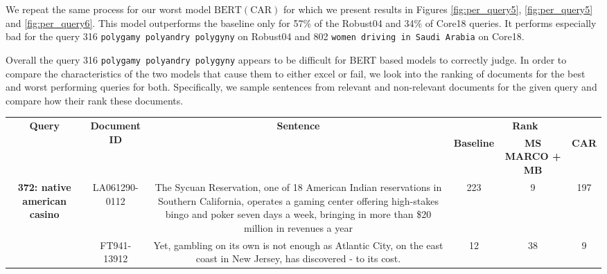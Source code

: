 We repeat the same process for our worst model $ \textrm{BERT}(\textrm{CAR}) $ for which we present results in Figures \ref{fig:per_query5}, \ref{fig:per_query5} and \ref{fig:per_query6}.
This model outperforms the baseline only for 57\% of the Robust04 and 34\% of Core18 queries.
It performs especially bad for the query 316 \texttt{polygamy polyandry polygyny} on Robust04 and 802 \texttt{women driving in Saudi Arabia} on Core18.

Overall the query 316 \texttt{polygamy polyandry polygyny} appears to be difficult for BERT based models to correctly judge.
In order to compare the characteristics of the two models that cause them to either excel or fail, we look into the ranking of documents for the best and worst performing queries for both.
Specifically, we sample sentences from relevant and non-relevant documents for the given query and compare how their rank these documents.

\begin{table}[]
\begin{tabular}{|c|c|c|c|c|c|}
\hline
\multirow{2}{*}{\textbf{Query}}                       & \multirow{2}{*}{\textbf{Document ID}} & \multirow{2}{*}{\textbf{Sentence}}                                                                                                                                                                                            & \multicolumn{3}{c|}{\textbf{Rank}}                                             \\ \cline{4-6} 
                                                      &                                       &                                                                                                                                                                                                                               & \textbf{Baseline} & \textbf{MS MARCO + MB} & \multicolumn{1}{l|}{\textbf{CAR}} \\ \hline
\multirow{2}{*}{\textbf{372: native american casino}} & LA061290-0112                         & The Sycuan Reservation, one of 18 American Indian reservations in Southern California, operates a gaming center offering high-stakes bingo and poker seven days a week, bringing in more than \$20 million in revenues a year & 223               & 9                      & 197                               \\ \cline{2-6} 
                                                      & FT941-13912                           & Yet, gambling on its own is not enough as Atlantic City, on the east coast in New Jersey, has discovered - to its cost.                                                                                                       & 12                & 38                     & 9                                 \\ \hline
\end{tabular}
\end{table}

